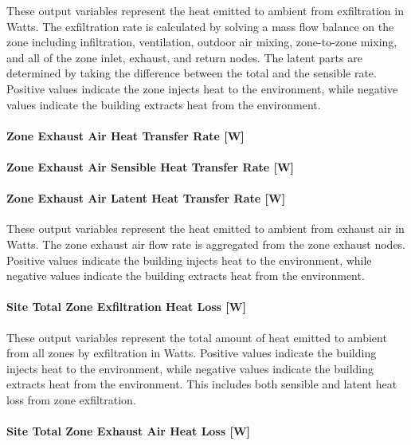 These output variables represent the heat emitted to ambient from exfiltration in Watts. The exfiltration rate is calculated by solving a mass flow balance on the zone including infiltration, ventilation, outdoor air mixing, zone-to-zone mixing, and all of the zone inlet, exhaust, and return nodes. The latent parts are determined by taking the difference between the total and the sensible rate. Positive values indicate the zone injects heat to the environment, while negative values indicate the building extracts heat from the environment. 

\paragraph{Zone Exhaust Air Heat Transfer Rate {[}W{]}}\label{zone-exhaust-heat-transfer-rate-w}

\paragraph{Zone Exhaust Air Sensible Heat Transfer Rate {[}W{]}}\label{zone-exhaust-sensible-heat-transfer-rate-w}

\paragraph{Zone Exhaust Air Latent Heat Transfer Rate {[}W{]}}\label{zone-exhaust-latent-heat-transfer-rate-w}

These output variables represent the heat emitted to ambient from exhaust air in Watts. The zone exhaust air flow rate is aggregated from the zone exhaust nodes. Positive values indicate the building injects heat to the environment, while negative values indicate the building extracts heat from the environment. 

\paragraph{Site Total Zone Exfiltration Heat Loss {[}W{]}}\label{site-total-exfiltration-heat-transfer-rate-w}

These output variables represent the total amount of heat emitted to ambient from all zones by exfiltration in Watts. Positive values indicate the building injects heat to the environment, while negative values indicate the building extracts heat from the environment. This includes both sensible and latent heat loss from zone exfiltration.

\paragraph{Site Total Zone Exhaust Air Heat Loss {[}W{]}}\label{site-total-exhaust-heat-transfer-rate-w}

